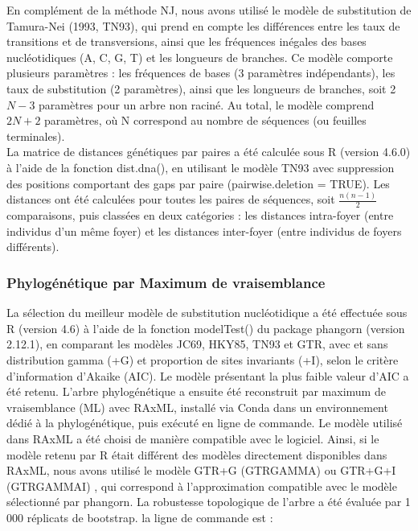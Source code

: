 \documentclass[a4paper,12pt]{article}
\begin{document}
En complément de la méthode NJ, nous avons utilisé le modèle de substitution de Tamura-Nei (1993, TN93), qui prend en compte les différences entre les taux de transitions et de transversions, ainsi que les fréquences inégales des bases nucléotidiques (A, C, G, T) et les longueurs de branches. Ce modèle comporte plusieurs paramètres : les fréquences de bases (3 paramètres indépendants), les taux de substitution (2 paramètres), ainsi que les longueurs de branches, soit 2$N - 3$ paramètres pour un arbre non raciné. Au total, le modèle comprend $2N + 2$ paramètres, où N correspond au nombre de séquences (ou feuilles terminales).\\


La matrice de distances génétiques par paires a été calculée sous R (version 4.6.0) à l’aide de la fonction dist.dna(), en utilisant le modèle TN93 avec suppression des positions comportant des gaps par paire (pairwise.deletion = TRUE). Les distances ont été calculées pour toutes les paires de séquences, soit $\frac{n(n-1)}{2}$ comparaisons, puis classées en deux catégories : les distances intra-foyer (entre individus d’un même foyer) et les distances inter-foyer (entre individus de foyers différents).

\subsubsection {Phylogénétique par Maximum de vraisemblance}
La sélection du meilleur modèle de substitution nucléotidique a été effectuée sous R (version 4.6) à l’aide de la fonction modelTest() du package phangorn (version 2.12.1), en comparant les modèles JC69, HKY85, TN93 et GTR, avec et sans distribution gamma (+G) et proportion de sites invariants (+I), selon le critère d’information d’Akaike (AIC). Le modèle présentant la plus faible valeur d’AIC a été retenu.
L’arbre phylogénétique a ensuite été reconstruit par maximum de vraisemblance (ML) avec RAxML, installé via Conda dans un environnement dédié à la phylogénétique, puis exécuté en ligne de commande. Le modèle utilisé dans RAxML a été choisi de manière compatible avec le logiciel. Ainsi, si le modèle retenu par R était différent des modèles directement disponibles dans RAxML, nous avons utilisé le modèle GTR+G (GTRGAMMA) ou GTR+G+I (GTRGAMMAI) \cite{stamatakisRAxMLVersion82014}, qui correspond à l’approximation compatible avec le modèle sélectionné par phangorn. La robustesse topologique de l’arbre a été évaluée par 1 000 réplicats de bootstrap. la ligne de commande est : 
\end{document}

